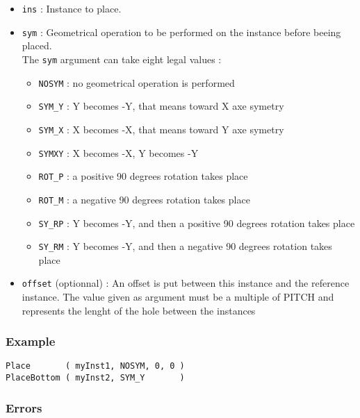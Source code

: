 \begin{itemize}
    \item \verb-ins- : Instance to place.
    \item \verb-sym- : Geometrical operation to be performed on the instance before beeing placed.\\The \verb-sym- argument can take eight legal values :
    \begin{itemize}
        \item \verb-NOSYM- : no geometrical operation is performed
        \item \verb-SYM_Y- : Y becomes -Y, that means toward X axe symetry
        \item \verb-SYM_X- : X becomes -X, that means toward Y axe symetry
        \item \verb-SYMXY- : X becomes -X, Y becomes -Y
        \item \verb-ROT_P- : a positive 90 degrees rotation takes place
        \item \verb-ROT_M- : a negative 90 degrees rotation takes place
        \item \verb-SY_RP- : Y becomes -Y, and then a positive 90 degrees rotation takes place
        \item \verb-SY_RM- : Y becomes -Y, and then a negative 90 degrees rotation takes place
    \end{itemize}    
    \item \verb-offset- (optionnal) : An offset is put between this instance and the reference instance. The value given as argument must be a multiple of PITCH and represents the lenght of the hole between the instances
\end{itemize}

\subsubsection{Example}

\begin{verbatim}
Place       ( myInst1, NOSYM, 0, 0 )
PlaceBottom ( myInst2, SYM_Y       )
\end{verbatim}

\subsubsection{Errors}
    
